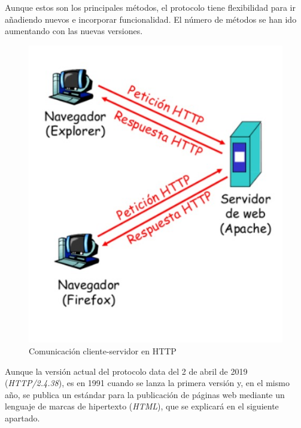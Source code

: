 Aunque estos son los principales métodos, el protocolo tiene flexibilidad para ir añadiendo nuevos e incorporar funcionalidad. El número de métodos se han ido aumentando con las nuevas versiones. 
\begin{figure}[h]
\centering
\includegraphics[scale=0.4]{img/http.jpeg}
\caption{Comunicación cliente-servidor en HTTP} \label{fig:http}
\end{figure}

Aunque la versión actual del protocolo data del 2 de abril de 2019 (\textit{HTTP/2.4.38}), es en 1991 cuando se lanza la primera versión y, en el mismo año, se publica un estándar para la publicación de páginas web mediante un lenguaje de marcas de hipertexto (\textit{HTML}), que se explicará en el siguiente apartado. 

